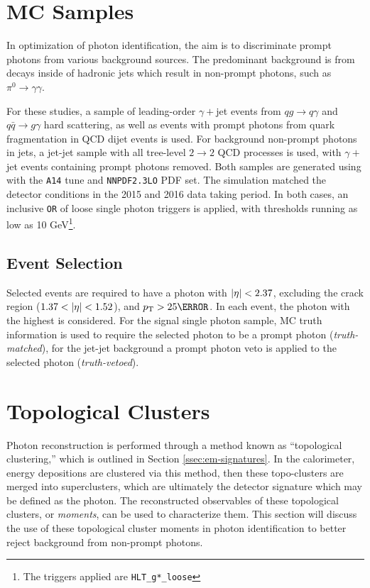 \section{MC Samples} \label{sec:photon-id-samples}

In optimization of photon identification, the aim is to discriminate prompt photons from various background sources. The predominant background is from decays inside of hadronic jets which result in non-prompt photons, such as $\pi^{0}\rightarrow \gamma \gamma$.

For these studies, a sample of leading-order $\gamma+$jet events from $qg \rightarrow q \gamma$ and $q\bar{q} \rightarrow g \gamma$ hard scattering, as well as events with prompt photons from quark fragmentation in QCD dijet events is used. For background non-prompt photons in jets, a jet-jet sample with all tree-level $2\rightarrow2$ QCD processes is used, with $\gamma+$jet events containing prompt photons removed. Both samples are generated using \peight with the \texttt{A14} tune and \texttt{NNPDF2.3LO} PDF set. The simulation matched the detector conditions in the 2015 and 2016 data taking period. In both cases, an inclusive \texttt{OR} of loose single photon triggers is applied, with thresholds running as low as 10 GeV\footnote{The triggers applied are \texttt{HLT\_g*\_loose}}.

\subsection{Event Selection}

Selected events are required to have a photon with $|\eta| < 2.37$, excluding the crack region ($1.37<\abseta<1.52$), and $\pt > \unit{25}{\GeV}$. In each event, the photon with the highest \pt is considered. For the signal single photon sample, \gls{MC} truth information is used to require the selected photon to be a prompt photon (\textit{truth-matched}), for the jet-jet background a prompt photon veto is applied to the selected photon (\textit{truth-vetoed}). 


\section{Topological Clusters} \label{sec:topo-clusters-yid}

Photon reconstruction is performed through a method known as ``topological clustering,'' which is outlined in Section \ref{ssec:em-signatures}. In the calorimeter, energy depositions are clustered via this method, then these topo-clusters are merged into superclusters, which are ultimately the detector signature which may be defined as the photon. The reconstructed observables of these topological clusters, or \textit{moments}, can be used to characterize them. This section will discuss the use of these topological cluster moments in photon identification to better reject background from non-prompt photons.

